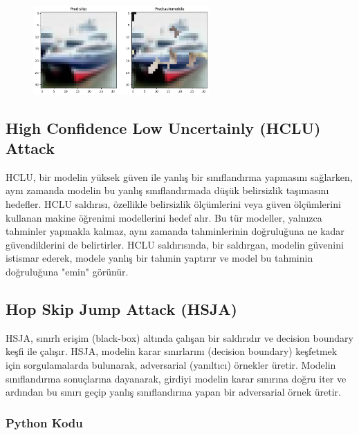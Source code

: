 \begin{figure}[h]
    \centering
    \includegraphics[width=0.6\textwidth]{images/graphite_results.png}
    \caption{}
\end{figure}

\newpage

\subsection{High Confidence Low Uncertainly (HCLU) Attack}

HCLU, bir modelin yüksek güven ile yanlış bir sınıflandırma yapmasını sağlarken, aynı zamanda modelin bu yanlış sınıflandırmada düşük belirsizlik taşımasını hedefler. HCLU saldırısı, özellikle belirsizlik ölçümlerini veya güven ölçümlerini kullanan makine öğrenimi modellerini hedef alır. Bu tür modeller, yalnızca tahminler yapmakla kalmaz, aynı zamanda tahminlerinin doğruluğuna ne kadar güvendiklerini de belirtirler. HCLU saldırısında, bir saldırgan, modelin güvenini istismar ederek, modele yanlış bir tahmin yaptırır ve model bu tahminin doğruluğuna "emin" görünür.

\newpage

\subsection{Hop Skip Jump Attack (HSJA)}

HSJA, sınırlı erişim (black-box) altında çalışan bir saldırıdır ve decision boundary keşfi ile çalışır. HSJA, modelin karar sınırlarını (decision boundary) keşfetmek için sorgulamalarda bulunarak, adversarial (yanıltıcı) örnekler üretir. Modelin sınıflandırma sonuçlarına dayanarak, girdiyi modelin karar sınırına doğru iter ve ardından bu sınırı geçip yanlış sınıflandırma yapan bir adversarial örnek üretir.

\subsubsection{Python Kodu}

